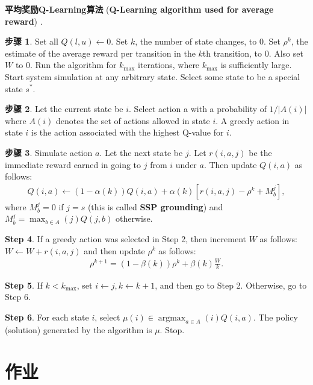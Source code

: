 \textbf{平均奖励Q-Learning算法} (\textbf{Q-Learning algorithm used for average reward}) \cite{gosavi2004reinforcement}.

\textbf{步骤 1}. Set all $Q(l,u) \leftarrow 0$. Set $k$, the number of state changes, to 0. Set $\rho^k$, the estimate of the average reward
per transition in the $k$th transition, to 0. Also set $W$ to 0. Run the algorithm for $k_{\max}$ iterations, where $k_{\max}$ is sufficiently large. Start system simulation at any arbitrary state. Select some state to be a special state $s^{*}$.

\textbf{步骤 2}. Let the current state be $i$. Select action a with a probability of $1/|A (i)|$ where $A(i)$ denotes the set of
actions allowed in state $i$. A greedy action in state $i$ is the action associated with the highest Q-value for $i$.

\textbf{步骤 3}. Simulate action $a$. Let the next state be $j$. Let $r(i, a, j)$ be the immediate reward earned in going to $j$ from $i$ under $a$. Then update $Q(i,a)$ as follows:
\begin{eqnarray}
  Q(i,a)\leftarrow (1-\alpha(k))Q(i,a)+\alpha(k)[r(i,a,j)-\rho^k+M_b^j],
\end{eqnarray}
where $M_b^j= 0$ if $j = s$ (this is called \textbf{SSP grounding}) and $M^j_b= \max_{b\in A}(j)Q(j,b)$ otherwise.

\textbf{Step 4}. If a greedy action was selected in Step 2, then increment $W$ as follows: $W \leftarrow W + r(i, a, j)$ and then update $\rho^k$ as follows:
\begin{eqnarray}
  \rho^{k+1}= (1 - \beta(k))\rho^k+ \beta(k)\frac{W}{k}.
\end{eqnarray}

\textbf{Step 5}. If $k < k_{\max}$, set $i \leftarrow j, k \leftarrow k + 1$, and then go to Step 2. Otherwise, go to Step 6.

\textbf{Step 6}. For each state $i$, select $\mu(i)\in  \mathop{\arg\max}_{a\in A }(i)Q(i, a)$. The policy (solution) generated by the algorithm is $\mu$. Stop.

\section{作业}

